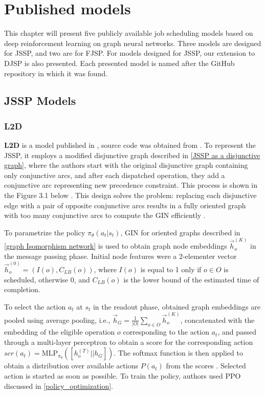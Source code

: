 \chapter{Published models}

This chapter will present five publicly available job scheduling models based on deep reinforcement learning on graph neural networks. Three models are designed for JSSP, and two are for FJSP. For models designed for JSSP, our extension to DJSP is also presented. Each presented model is named after the GitHub repository in which it was found. 

\section{JSSP Models}

\subsection{L2D} \label{l2d_model}
\textbf{L2D} is a model published in \cite{zhang2020learning}, source code was obtained from \cite{github_l2d}. To represent the JSSP, it employs a modified disjunctive graph described in \ref{JSSP as a disjunctive graph}, where the authors start with the original disjunctive graph containing only conjunctive arcs, and after each dispatched operation, they add a conjunctive arc representing new precedence constraint. This process is shown in the Figure 3.1 below \cite{zhang2020learning}. This design solves the problem: replacing each disjunctive edge with a pair of opposite conjunctive arcs results in a fully oriented graph with too many conjunctive arcs to compute the GIN efficiently \cite{zhang2020learning}.
\par
To parametrize the policy $\pi_\theta(a_t|s_t)$, GIN for oriented graphs described in \ref{graph Isomorphism network} is used to obtain graph node embeddings $\vec{h}_o^{(K)}$ in the message passing phase. Initial node features were a 2-elementer vector $\vec{h}_o^{(0)} = (I(o), C_{LB}(o))$, where $I(o)$ is equal to 1 only if $o \in O$ is scheduled, otherwise 0, and $C_{LB}(o)$ is the lower bound of the estimated time of completion. 
\par
To select the action $a_t$ at $s_t$ in the readout phase, obtained graph embeddings are pooled using average pooling, i.e., $\vec{h}_G = \frac{1}{|O|} \sum_{o \in O} \vec{h}_o^{(K)}$, concatenated with the embedding of the eligible operation $o$ corresponding to the action $a_t$, and passed through a multi-layer perceptron to obtain a score for the corresponding action $scr(a_t) = \text{MLP}_{\pi_\theta}\left ( \left [h_o^{(T)} || h_G \right ] \right )$. The softmax function is then applied to obtain a distribution over available actions $P(a_t)$ from the scores \cite{zhang2020learning}. Selected action is started as soon as possible. To train the policy, authors used PPO discussed in \ref{policy_optimization}.
